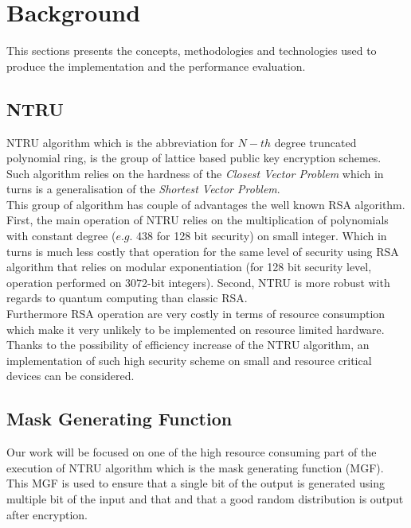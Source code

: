 \section{Background}
\label{sec:background}

This sections presents the concepts, methodologies and technologies used to produce the implementation and the performance evaluation.

\subsection{NTRU}
NTRU algorithm which is the abbreviation for $N-th$ degree truncated polynomial ring, is the group of lattice based public key encryption schemes.\\
Such algorithm relies on the hardness of the \textit{Closest Vector Problem} which in turns is a generalisation of the \textit{Shortest Vector Problem}.\\
This group of algorithm has couple of advantages the well known RSA algorithm. First, the main operation of NTRU relies on the multiplication of polynomials with constant degree ($e.g.$ 438 for 128 bit security) on small integer. Which in turns is much less costly that operation for the same level of security using RSA algorithm that relies on modular exponentiation (for 128 bit security level, operation performed on 3072-bit integers). Second, NTRU is more robust with regards to quantum computing than classic RSA.\\
Furthermore RSA operation are very costly in terms of resource consumption which make it very unlikely to be implemented on resource limited hardware. Thanks to the possibility of efficiency increase of the NTRU algorithm, an implementation of such high security scheme on small and resource critical devices can be considered.
\subsection{Mask Generating Function}
Our work will be focused on one of the high resource consuming part of the execution of NTRU algorithm which is the mask generating function (MGF). This MGF is used to ensure that a single bit of the output is generated using multiple bit of the input and that and that a good random distribution is output after encryption.\\

